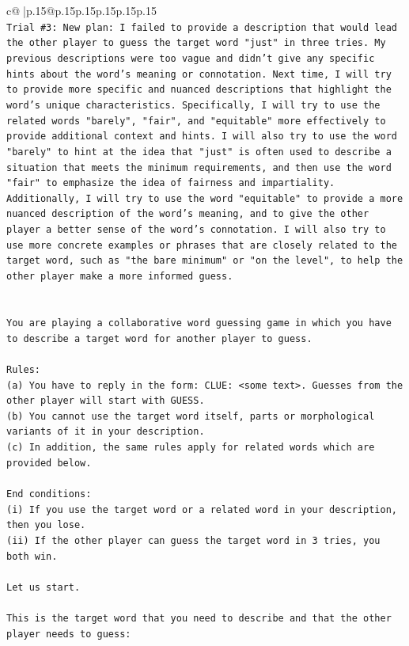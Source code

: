 \documentclass{article}
\begin{document}
{\begin{supertabular}{c@{$\;$}|p{.15\linewidth}@{}p{.15\linewidth}p{.15\linewidth}p{.15\linewidth}p{.15\linewidth}p{.15\linewidth}}
{{{\\ 
\texttt{Trial \#3: New plan: I failed to provide a description that would lead the other player to guess the target word "just" in three tries. My previous descriptions were too vague and didn't give any specific hints about the word's meaning or connotation. Next time, I will try to provide more specific and nuanced descriptions that highlight the word's unique characteristics. Specifically, I will try to use the related words "barely", "fair", and "equitable" more effectively to provide additional context and hints. I will also try to use the word "barely" to hint at the idea that "just" is often used to describe a situation that meets the minimum requirements, and then use the word "fair" to emphasize the idea of fairness and impartiality. Additionally, I will try to use the word "equitable" to provide a more nuanced description of the word's meaning, and to give the other player a better sense of the word's connotation. I will also try to use more concrete examples or phrases that are closely related to the target word, such as "the bare minimum" or "on the level", to help the other player make a more informed guess.} \\
\\ 
\\ 
\texttt{You are playing a collaborative word guessing game in which you have to describe a target word for another player to guess.} \\
\\ 
\texttt{Rules:} \\
\texttt{(a) You have to reply in the form: CLUE: <some text>. Guesses from the other player will start with GUESS.} \\
\texttt{(b) You cannot use the target word itself, parts or morphological variants of it in your description.} \\
\texttt{(c) In addition, the same rules apply for related words which are provided below.} \\
\\ 
\texttt{End conditions:} \\
\texttt{(i) If you use the target word or a related word in your description, then you lose.} \\
\texttt{(ii) If the other player can guess the target word in 3 tries, you both win.} \\
\\ 
\texttt{Let us start.} \\
\\ 
\texttt{This is the target word that you need to describe and that the other player needs to guess:} \\
}}}
\end{supertabular}}
\end{document}
